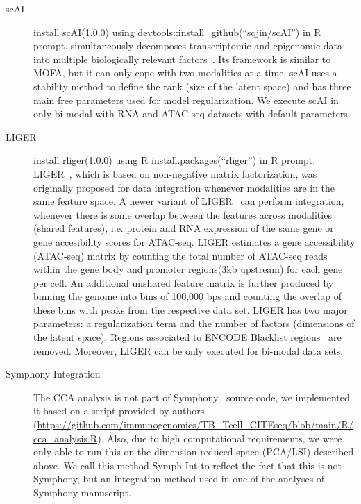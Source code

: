 \begin{description}
\item[scAI]
install scAI(1.0.0) using devtools::install\_github(``sqjin/scAI'') in R prompt.
 simultaneously decomposes transcriptomic and epigenomic data into multiple biologically relevant factors~\cite{clark2018scnmt}. Its framework is similar to MOFA, but it can only cope with two modalities at a time. scAI uses a stability method to define the rank (size of the latent space) and has three main free parameters used for model regularization. We execute scAI in only bi-modal with RNA and ATAC-seq datasets with default parameters.


\item[LIGER]

install rliger(1.0.0) using R install.packages(``rliger'') in R prompt.
LIGER~\cite{welch2019single}, which is based on non-negative matrix factorization, was originally proposed for data integration whenever modalities are in the same feature space.  A newer variant of LIGER~\cite{kriebel2021nonnegative} can perform integration, whenever there is some overlap between the features across modalities (shared features), i.e. protein and RNA expression of the same gene or gene accesibility scores for ATAC-seq. LIGER estimates a gene accessibility (ATAC-seq) matrix by counting the total number of ATAC-seq reads within the gene body and promoter regions(3kb upstream) for each gene per cell. An additional unshared feature matrix is further produced by binning the genome into bins of 100,000 bps and counting the overlap of these bins with peaks from the respective data set. LIGER has two major parameters: a regularization term and the number of factors (dimensions of the latent space). Regions associated to ENCODE Blacklist regions~\cite{amemiya2019encode} are removed. Moreover, LIGER can be only executed for bi-modal data sets. 

\item[Symphony Integration]
The CCA analysis is not part of Symphony~\cite{kang2021symphony} source code, we implemented it based on a script provided by authors (\url{https://github.com/immunogenomics/TB_Tcell_CITEseq/blob/main/R/cca_analysis.R}). 
Also, due to high computational requirements, we were only able to run this on the dimension-reduced space (PCA/LSI) described above. We call this method Symph-Int to reflect the fact that this is not Symphony, but an integration method used in one of the analyses of Symphony manuscript. 


\end{description}

